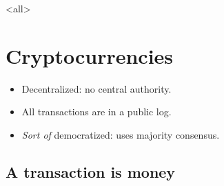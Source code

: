 \mode*

\mode<all>{}


\section{Cryptocurrencies}

\begin{frame}
  \begin{idea}
    \begin{itemize}
      \item Decentralized: no central authority.
      \item All transactions are in a public log.
      \item \emph{Sort of} democratized: uses majority consensus.
    \end{itemize}
  \end{idea}
\end{frame}


\subsection{A transaction is money}

